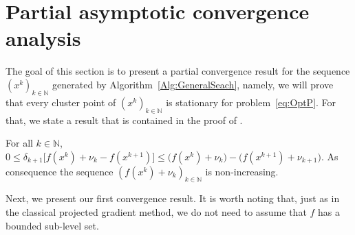 \section{Partial asymptotic convergence analysis} \label{Sec:PartialConvRes}
The goal  of this section is to present a partial  convergence result for  the sequence $(x^k)_{k\in\mathbb{N}}$ generated by Algorithm~\ref{Alg:GeneralSeach}, namely, we will prove that every cluster point of $(x^k)_{k\in\mathbb{N}}$ is stationary for problem~\eqref{eq:OptP}.  For that, we state a result that is contained in the proof of \cite[Theorem 4]{GrapigliaSachs2017}. 
\begin{lemma} \label{le:fkvk}
For all $k \in \mathbb{N}$,   $0\leq \delta_{k+1}\big[ f(x^{k})+\nu_{k}-  f(x^{k+1})\big] \leq \big( f(x^{k})+\nu_{k}\big) - \big( f(x^{k+1})+\nu_{k+1}\big)$. As consequence the sequence   $\left(f(x^k)+\nu_k\right)_{k\in\mathbb{N}}$ is    non-increasing.
	
\end{lemma}


Next, we present our first convergence result. It is worth noting that, just as in the classical projected gradient method, we do not need to assume that $f$ has a bounded sub-level  set.

